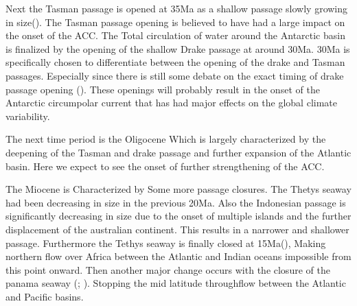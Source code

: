Next the Tasman passage is opened at 35Ma as a shallow passage slowly growing in size(\cite{Lawver2003Sep}). The Tasman passage opening is believed to have had a large impact on the onset of the ACC. The Total circulation of water around the Antarctic basin is finalized by the opening of the shallow Drake passage at around 30Ma. 30Ma is specifically chosen to differentiate between the opening of the drake and Tasman passages. Especially since there is still some debate on the exact timing of drake passage opening (\cite{Scher2006Apr}). These openings will probably result in the onset of the Antarctic circumpolar current that has had major effects on the global climate variability.


The next time period is the Oligocene Which is largely characterized by the deepening of the Tasman and drake passage and further expansion of the Atlantic basin. Here we expect to see the onset of further strengthening of the ACC.


The Miocene is Characterized by Some more passage closures. The Thetys seaway had been decreasing in size in the previous 20Ma. Also the Indonesian passage is significantly decreasing in size due to the onset  of multiple islands and the further displacement of the australian continent. This results in a narrower and shallower passage. Furthermore the Tethys seaway is finally closed at 15Ma(\cite{Hamon2013Nov}), Making northern flow over Africa between the Atlantic and Indian oceans impossible from this point onward. Then another major change occurs with the closure of the panama seaway (\cite{Molnar2008Jun}; \cite{Pindell1988Dec}). Stopping the mid latitude throughflow between the Atlantic and Pacific basins.



